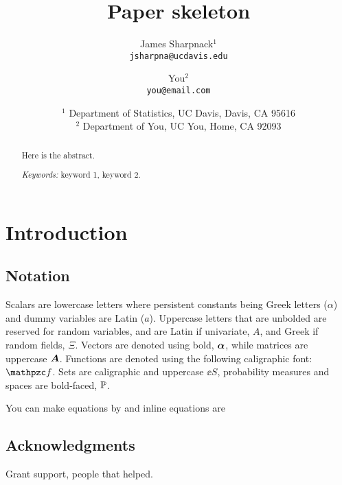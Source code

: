 \documentclass[twoside,11pt]{article}
\begin{document}
\title{Paper skeleton}
\author{
James Sharpnack$^{1}$ \\
{\tt  jsharpna@ucdavis.edu} \\
\and
You$^{2}$\\
{\tt you@email.com}\\
\and
\begin{tabular}{c}
  $^{1}$ Department of Statistics, UC Davis, Davis, CA 95616\\
  $^{2}$ Department of You, UC You, Home, CA 92093\\
\end{tabular}
}

\date{}%
\maketitle

\begin{abstract}
Here is the abstract.

\medskip\noindent
{\em Keywords:} keyword 1, keyword 2.
\end{abstract}


\section{Introduction}
\label{sec:intro}

\subsection{Notation}
Scalars are lowercase letters where persistent constants being Greek letters ($\alpha$) and dummy variables are Latin ($a$).  
Uppercase letters that are unbolded are reserved for random variables, and are Latin if univariate, $A$, and Greek if random fields, $\Xi$.
Vectors are denoted using bold, $\bm \alpha$, while matrices are uppercase $\bm A$.
Functions are denoted using the following caligraphic font: $\ff f$.
Sets are caligraphic and uppercase $\ee S$, probability measures and spaces are bold-faced, $\mathbb P$.

You can make equations by 
\beq
\label{eq:eqname}
\vv \alpha \star \vv \beta
\eeq
and inline equations are \teq{\sum \alpha + \beta}
\subsection*{Acknowledgments}

Grant support, people that helped.



\end{document}
